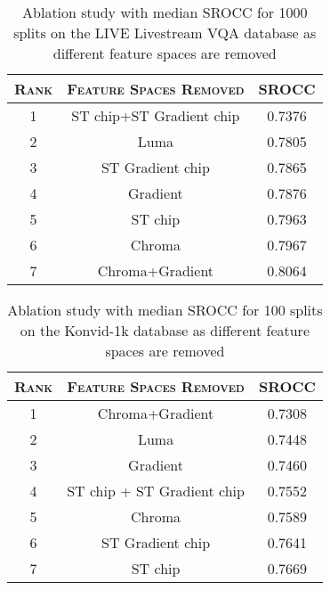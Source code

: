 \documentclass[journal]{IEEEtran}
\begin{document}
\begin{table}
\caption{Ablation study with median SROCC for 1000 splits on the LIVE Livestream VQA database as different feature spaces are removed}
\begin{center} 
\begin{tabular}{|c|c|c|}
\hline
\textsc{Rank} & \textsc{Feature Spaces Removed}  & SROCC \\
\hline
1 & ST chip+ST Gradient chip & 0.7376 \\ 
\hline
2 & Luma  & 0.7805 \\ 
\hline
3 & ST Gradient chip  & 0.7865 \\
\hline
4 & Gradient  & 0.7876 \\ 
\hline
5 & ST chip  & 0.7963 \\
\hline
6 & Chroma  & 0.7967 \\
\hline
7 & Chroma+Gradient & 0.8064 \\
\hline
\end{tabular}
\label{tab:ablapv}
\end{center}
\vspace{-5mm}
\end{table}

\begin{table}
\caption{Ablation study with median SROCC for 100 splits on the Konvid-1k database as different feature spaces are removed}
\begin{center} 
\begin{tabular}{|c|c|c|}
\hline
\textsc{Rank} & \textsc{Feature Spaces Removed}  & SROCC \\
\hline
1 & Chroma+Gradient & 0.7308 \\ 
\hline
2 & Luma  & 0.7448 \\ 
\hline
3 & Gradient  & 0.7460 \\
\hline
4 & ST chip + ST Gradient chip & 0.7552 \\ 
\hline
5 & Chroma  & 0.7589 \\
\hline
6 & ST Gradient chip  & 0.7641 \\
\hline
7 & ST chip  & 0.7669 \\
\hline
\end{tabular}
\label{tab:ablkvd}
\end{center}
\vspace{-5mm}
\end{table}
\end{document}
